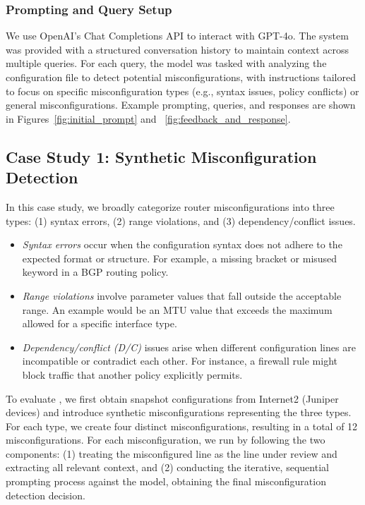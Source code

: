 \subsubsection{Prompting and Query Setup}
We use OpenAI’s Chat Completions API to interact with GPT-4o. The system was provided with a structured conversation history to maintain context across multiple queries. For each query, the model was tasked with analyzing the configuration file to detect potential misconfigurations, with instructions tailored to focus on specific misconfiguration types (e.g., syntax issues, policy conflicts) or general misconfigurations. Example prompting, queries, and responses are shown in Figures~\ref{fig:initial_prompt} and ~\ref{fig:feedback_and_response}.

\subsection{Case Study 1: Synthetic Misconfiguration Detection}
In this case study, we broadly categorize router misconfigurations into three types: (1) syntax errors, (2) range violations, and (3) dependency/conflict issues.
\begin{itemize}
    \item \textit{Syntax errors} occur when the configuration syntax does not adhere to the expected format or structure. For example, a missing bracket or misused keyword in a BGP routing policy.
    \item \textit{Range violations} involve parameter values that fall outside the acceptable range. An example would be an MTU value that exceeds the maximum allowed for a specific interface type.
    \item \textit{Dependency/conflict (D/C)} issues arise when different configuration lines are incompatible or contradict each other. For instance, a firewall rule might block traffic that another policy explicitly permits.
\end{itemize}

To evaluate \sysname{}, we first obtain snapshot configurations from Internet2 (Juniper devices) and introduce synthetic misconfigurations representing the three types. For each type, we create four distinct misconfigurations, resulting in a total of 12 misconfigurations. For each misconfiguration, we run \sysname{} by following the two components: (1) treating the misconfigured line as the line under review and extracting all relevant context, and (2) conducting the iterative, sequential prompting process against the model, obtaining the final misconfiguration detection decision.

